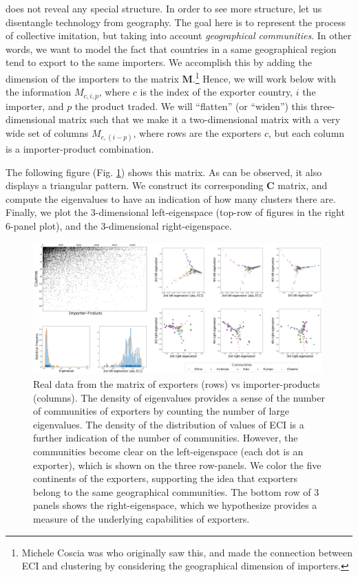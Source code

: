 \documentclass[12pt]{article}
\newcommand{\mtx}[1]{\mathbf{ #1}}
\begin{document}
 does not reveal any special structure. In order to see more structure, let us disentangle technology from geography. The goal here is to represent the process of collective imitation, but taking into account \emph{geographical communities}. In other words, we want to model the fact that countries in a same geographical region tend to export to the same importers. We accomplish this by adding the dimension of the importers to the matrix $\mtx{M}$.\footnote{Michele Coscia was who originally saw this, and made the connection between ECI and clustering by considering the geographical dimension of importers.} Hence, we will work below with the information $M_{c,i,p}$, where $c$ is the index of the exporter country, $i$ the importer, and $p$ the product traded. We will ``flatten'' (or ``widen'') this three-dimensional matrix such that we make it a two-dimensional matrix with a very wide set of columns $M_{c,(i-p)}$, where rows are the exporters $c$, but each column is a importer-product combination.


The following figure (Fig. {\ref{660559}}) shows this matrix. As can be observed, it 
also displays a triangular pattern. We construct its corresponding $\mtx{C}$ matrix, and compute the eigenvalues to
have an indication of how many clusters there are. Finally, we plot the
3-dimensional left-eigenspace (top-row of figures in the right 6-panel
plot), and the 3-dimensional right-eigenspace. 
\begin{figure}[h]
	\begin{center}
		\includegraphics[width=0.99\textwidth]{Meip_figs.png}
	\caption{{Real data from the matrix of exporters (rows) vs importer-products
	(columns). The density of eigenvalues provides a sense of the number of
	communities of exporters by counting the number of large eigenvalues.
	The density of the distribution of values of ECI is a further indication
	of the number of communities. However, the communities become clear on
	the left-eigenspace (each dot is an exporter), which is shown on the
	three row-panels. We color the five continents of the exporters,
	supporting the idea that exporters belong to the same geographical
	communities. The bottom row of 3 panels shows the right-eigenspace,
	which we hypothesize provides a measure of the underlying capabilities
	of exporters.
	{\label{660559}}%
	}}
	\end{center}
\end{figure}
\end{document}
